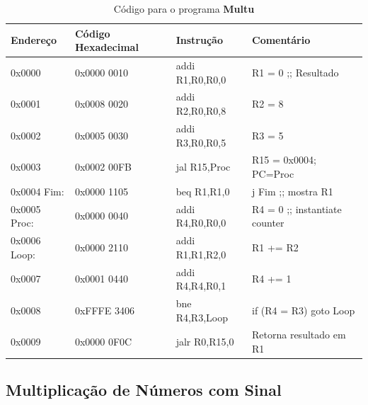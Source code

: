 \documentclass[12pt]{article}
\begin{document}
\begin{table}[H]
    \centering
    \caption{Código para o programa \textbf{Multu}}
    \begin{tabular}{|l|l|l|l|}\hline
        \textbf{Endereço} & \textbf{Código Hexadecimal} & \textbf{Instrução} & \textbf{Comentário} \\\hline
        0x0000       & 0x0000 0010 & addi R1,R0,R0,0 & R1 = 0 ;; Resultado           \\\hline
        0x0001       & 0x0008 0020 & addi R2,R0,R0,8 & R2 = 8                        \\\hline
        0x0002       & 0x0005 0030 & addi R3,R0,R0,5 & R3 = 5                        \\\hline
        0x0003       & 0x0002 00FB & jal R15,Proc    & R15 = 0x0004; PC=Proc         \\\hline
        0x0004 Fim:  & 0x0000 1105 & beq R1,R1,0     & j Fim ;; mostra R1            \\\hline
        0x0005 Proc: & 0x0000 0040 & addi R4,R0,R0,0 & R4 = 0 ;; instantiate counter \\\hline
        0x0006 Loop: & 0x0000 2110 & addi R1,R1,R2,0 & R1 += R2                      \\\hline
        0x0007       & 0x0001 0440 & addi R4,R4,R0,1 & R4 += 1                       \\\hline
        0x0008       & 0xFFFE 3406 & bne  R4,R3,Loop & if (R4 \!= R3) goto Loop      \\\hline
        0x0009       & 0x0000 0F0C & jalr R0,R15,0   & Retorna resultado em R1       \\\hline
    \end{tabular}\label{tab:programs:multu}
\end{table}

\subsection{Multiplicação de Números com Sinal}\label{sec:programs:mult}
\end{document}

